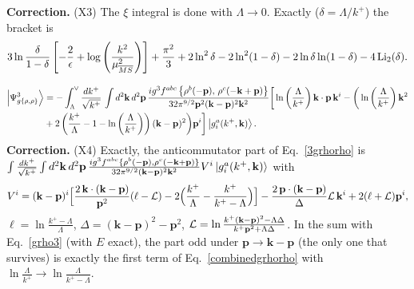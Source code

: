 \documentclass[aps,prd,amsmath,amssymb,nofootinbib]{revtex4-2}
\numberwithin{equation}{section}
\begin{document}
{\color{blue}\noindent\textbf{Correction.} (X3) The $\xi$ integral is done with $\Lambda\to0$. Exactly ($\delta=\Lambda/k^+$) the bracket is
\begin{equation*}
3\ln\frac{\delta}{1-\delta}\left[-\frac{2}{\epsilon}+\log{\left(\frac{k^{2}}{\mu^{2}_{\overline{MS}}}\right)}\right]+\frac{\pi^{2}}{3}+2\ln^2\delta-2\ln^2(1-\delta)-2\ln\delta\ln(1-\delta)-4\,{\rm Li}_2(\delta).
\end{equation*}}

\begin{align}\label{tworho2}
\left|\Psi_{g\{\rho,\rho\}}^{3}\right\rangle & = -\int_{\Lambda}^{\vee}\frac{dk^{+}}{\sqrt{k^{+}}}\,\int d^{2}\mathbf{k}\, d^{2}\mathbf{p}\,\frac{ig^{3}f^{abc}\left\{ \rho^{b}(-\mathbf{p}),\,\rho^{c}(-\mathbf{k}+\mathbf{p})\right\} }{32\pi^{9/2}\mathbf{p}^{2}(\mathbf{k}-\mathbf{p})^{2}\mathbf{k}^{2}}\bigg[\ln\left(\frac{\Lambda}{k^{+}}\right)\mathbf{k}\cdot \mathbf{p}\,\mathbf{k}^{i}-\bigg(\ln\left(\frac{\Lambda}{k^{+}}\right)\mathbf{k}^{2}\notag \\ & +2\left(\frac{k^{+}}{\Lambda}-1-\ln\left(\frac{\Lambda}{k^{+}}\right)\right)(\mathbf{k}-\mathbf{p})^{2}\bigg)\mathbf{p}^{i}\bigg]\left|g_{i}^{a}(k^{+},\mathbf{k})\right\rangle.
\end{align}
{\color{blue}\noindent\textbf{Correction.} (X4) Exactly, the anticommutator part of Eq.~\eqref{3grhorho} is
$\int\frac{dk^{+}}{\sqrt{k^{+}}}\int d^{2}\mathbf{k}\,d^2\mathbf{p}\,\frac{ig^{3}f^{abc}\{\rho^{b}(-\mathbf{p}),\rho^{c}(-\mathbf{k}+\mathbf{p})\}}{32\pi^{9/2}(\mathbf{k}-\mathbf{p})^{2}\mathbf{k}^{2}}V^i\ket{g^a_i(k^+,\mathbf{k})}$ with
\begin{equation*}
V^i=(\mathbf{k}-\mathbf{p})^i\Big[\frac{2\,\mathbf{k}\cdot(\mathbf{k}-\mathbf{p})}{\mathbf{p}^2}(\ell-{\cal L})-2\Big(\frac{k^+}{\Lambda}-\frac{k^+}{k^+-\Lambda}\Big)\Big]-\frac{2\,\mathbf{p}\cdot(\mathbf{k}-\mathbf{p})}{\Delta}{\cal L}\,\mathbf{k}^i+2(\ell+{\cal L})\mathbf{p}^i,
\end{equation*}
$\ell=\ln\frac{k^+-\Lambda}{\Lambda}$, $\Delta=(\mathbf{k}-\mathbf{p})^2-\mathbf{p}^2$, ${\cal L}=\ln\frac{k^+(\mathbf{k}-\mathbf{p})^2-\Lambda\Delta}{k^+\mathbf{p}^2+\Lambda\Delta}$. In the sum with Eq.~\eqref{grho3} (with $E$ exact), the part odd under $\mathbf p\to\mathbf k-\mathbf p$ (the only one that survives) is exactly the first term of Eq.~\eqref{combinedgrhorho} with $\ln\frac{\Lambda}{k^+}\to\ln\frac{\Lambda}{k^+-\Lambda}$.}
\end{document}
